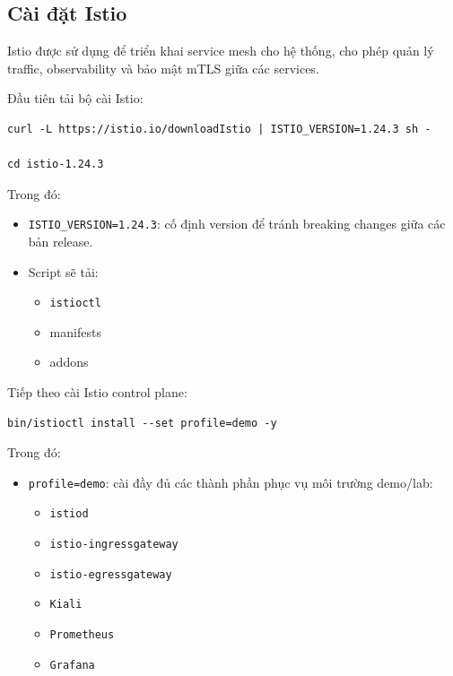 \subsection{Cài đặt Istio}

Istio được sử dụng để triển khai service mesh cho hệ thống, cho phép quản lý traffic, observability và bảo mật mTLS giữa các services.

Đầu tiên tải bộ cài Istio:

\begin{verbatim}
curl -L https://istio.io/downloadIstio | ISTIO_VERSION=1.24.3 sh -

cd istio-1.24.3
\end{verbatim}

Trong đó:
\begin{itemize}
    \item \texttt{ISTIO\_VERSION=1.24.3}: cố định version để tránh breaking changes giữa các bản release.
    
    \item Script sẽ tải:
    \begin{itemize}
        \item \texttt{istioctl}
        \item manifests
        \item addons
    \end{itemize}
\end{itemize}

\vspace{0.5em}

Tiếp theo cài Istio control plane:

\begin{verbatim}
bin/istioctl install --set profile=demo -y
\end{verbatim}

Trong đó:
\begin{itemize}
    \item \texttt{profile=demo}: cài đầy đủ các thành phần phục vụ môi trường demo/lab:
    
    \begin{itemize}
        \item \texttt{istiod}
        \item \texttt{istio-ingressgateway}
        \item \texttt{istio-egressgateway}
        \item \texttt{Kiali}
        \item \texttt{Prometheus}
        \item \texttt{Grafana}
    \end{itemize}
    
\end{itemize}


